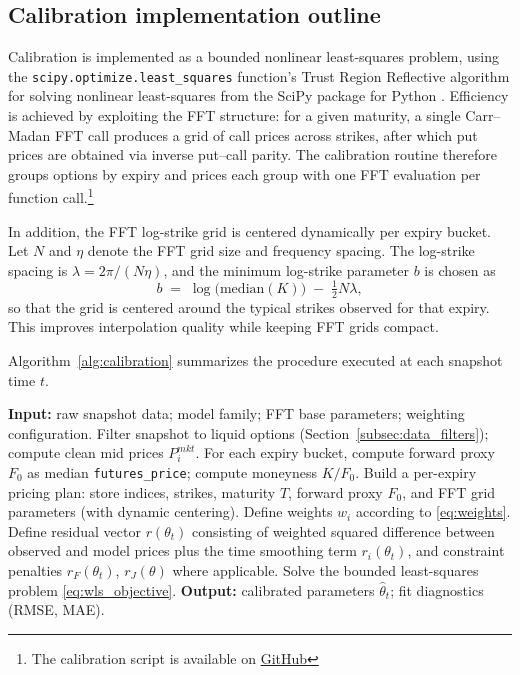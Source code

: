 \documentclass[a4paper,titlepage,12pt]{report}
\theoremstyle{plain}
\begin{document}
\subsection{Calibration implementation outline}\label{subsec:implementation_outline}

Calibration is implemented as a bounded nonlinear least-squares problem, using the \texttt{scipy.optimize.least\_squares} function's Trust Region Reflective algorithm for solving nonlinear least-squares \citep{BranchColemanLi1999} from the SciPy package for Python \citep{SciPy}. Efficiency is achieved by exploiting the FFT structure: for a given maturity, a single Carr--Madan FFT call produces a grid of call prices across strikes, after which put prices are obtained via inverse put--call parity. The calibration routine therefore groups options by expiry and prices each group with one FFT evaluation per function call.\footnote{The calibration script is available on \href{https://github.com/znmahbub/SVCJ-Deribit-Inverse-Options-Pricer}{GitHub}}

In addition, the FFT log-strike grid is centered dynamically per expiry bucket. Let $N$ and $\eta$ denote the FFT grid size and frequency spacing. The log-strike spacing is $\lambda = 2\pi/(N\eta)$, and the minimum log-strike parameter $b$ is chosen as
\[
b \;=\; \log\!\bigl(\mathrm{median}(K)\bigr) \;-\; \tfrac12 N \lambda,
\]
so that the grid is centered around the typical strikes observed for that expiry. This improves interpolation quality while keeping FFT grids compact.

Algorithm~\ref{alg:calibration} summarizes the procedure executed at each snapshot time $t$.

\begin{algorithm}[H]
\caption{Cross-sectional calibration at snapshot time $t$.}\label{alg:calibration}
\begin{algorithmic}[1]
\State \textbf{Input:} raw snapshot data; model family; FFT base parameters; weighting configuration.
\State Filter snapshot to liquid options (Section~\ref{subsec:data_filters}); compute clean mid prices $P^{mkt}_i$.
\State For each expiry bucket, compute forward proxy $F_0$ as median \texttt{futures\_price}; compute moneyness $K/F_0$.
\State Build a per-expiry pricing plan: store indices, strikes, maturity $T$, forward proxy $F_0$, and FFT grid parameters (with dynamic centering).
\State Define weights $w_i$ according to \eqref{eq:weights}.
\State Define residual vector $r(\theta_t)$ consisting of weighted squared difference between observed and model prices plus the time smoothing term $r_i(\theta_t)$, and constraint penalties $r_F(\theta_t)$, $r_J(\theta)$ where applicable.
\State Solve the bounded least-squares problem \eqref{eq:wls_objective}.
\State \textbf{Output:} calibrated parameters $\hat{\theta}_t$; fit diagnostics (RMSE, MAE).
\end{algorithmic}
\end{algorithm}
\end{document}
